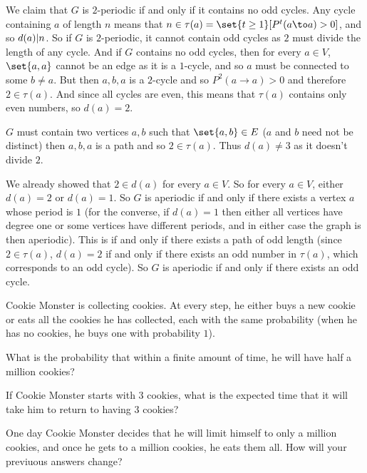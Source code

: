     \item We claim that $G$ is $2$-periodic if and only if it contains no odd cycles.
    Any cycle containing $a$ of length $n$ means that $n\in\tau(a)=\set{t\geq1}[P^t(a\to a)>0]$, and so $d(a){\mid} n$.
    So if $G$ is $2$-periodic, it cannot contain odd cycles as $2$ must divide the length of any cycle.
    And if $G$ contains no odd cycles, then for every $a\in V$, $\set{a,a}$ cannot be an edge as it is a $1$-cycle, and so $a$ must be connected to some $b\neq a$.
    But then $a,b,a$ is a $2$-cycle and so $P^2(a\to a)>0$ and therefore $2\in\tau(a)$.
    And since all cycles are even, this means that $\tau(a)$ contains only even numbers, so $d(a)=2$.

    \item $G$ must contain two vertices $a,b$ such that $\set{a,b}\in E$ ($a$ and $b$ need not be distinct) then $a,b,a$ is a path and so $2\in\tau(a)$.
    Thus $d(a)\neq3$ as it doesn't divide $2$.

    \item We already showed that $2\in d(a)$ for every $a\in V$.
    So for every $a\in V$, either $d(a)=2$ or $d(a)=1$.
    So $G$ is aperiodic if and only if there exists a vertex $a$ whose period is $1$ (for the converse, if $d(a)=1$ then either all vertices have degree one or some vertices have different periods, and in
    either case the graph is then aperiodic).
    This is if and only if there exists a path of odd length (since $2\in\tau(a)$, $d(a)=2$ if and only if there exists an odd number in $\tau(a)$, which corresponds to an odd cycle).
    So $G$ is aperiodic if and only if there exists an odd cycle.
\eenum

\bexerc

    Cookie Monster is collecting cookies.
    At every step, he either buys a new cookie or eats all the cookies he has collected, each with the same probability (when he has no cookies, he buys one with probability $1$).
    \benum
        \item What is the probability that within a finite amount of time, he will have half a million cookies?
        \item If Cookie Monster starts with $3$ cookies, what is the expected time that it will take him to return to having $3$ cookies?
        \item One day Cookie Monster decides that he will limit himself to only a million cookies, and once he gets to a million cookies, he eats them all.
        How will your previuous answers change?
    \eenum

